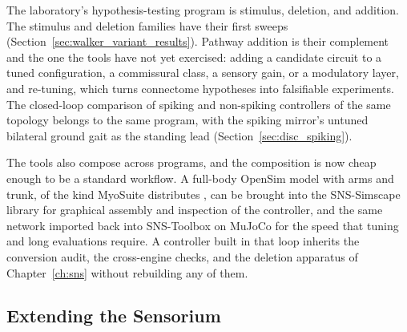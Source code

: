 The laboratory's hypothesis-testing program is stimulus, deletion, and addition. The stimulus and deletion families have their first sweeps (Section~\ref{sec:walker_variant_results}). Pathway addition is their complement and the one the tools have not yet exercised: adding a candidate circuit to a tuned configuration, a commissural class, a sensory gain, or a modulatory layer, and re-tuning, which turns connectome hypotheses into falsifiable experiments. The closed-loop comparison of spiking and non-spiking controllers of the same topology belongs to the same program, with the spiking mirror's untuned bilateral ground gait as the standing lead (Section~\ref{sec:disc_spiking}).

The tools also compose across programs, and the composition is now cheap enough to be a standard workflow. A full-body OpenSim model with arms and trunk, of the kind MyoSuite distributes \citep{caggiano_myosuite_2022}, can be brought into the SNS-Simscape library for graphical assembly and inspection of the controller, and the same network imported back into SNS-Toolbox on MuJoCo \citep{nourse_sns_2023} for the speed that tuning and long evaluations require. A controller built in that loop inherits the conversion audit, the cross-engine checks, and the deletion apparatus of Chapter~\ref{ch:sns} without rebuilding any of them.

\subsection{Extending the Sensorium}\label{sec:fw_senses}


